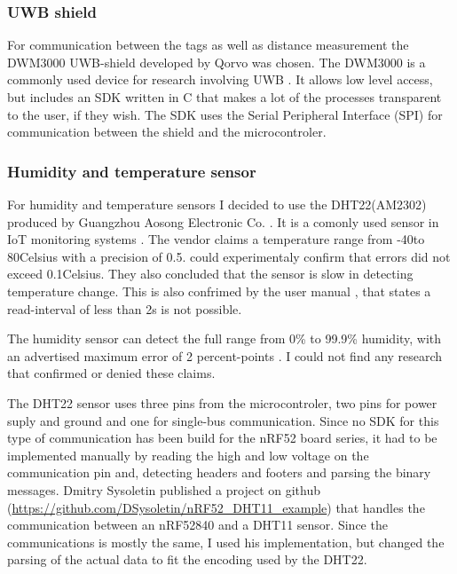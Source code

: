 \subsubsection{UWB shield}
For communication between the tags as well as distance measurement the DWM3000 UWB-shield developed by Qorvo was chosen.
The DWM3000 is a commonly used device for research involving UWB \cite{coppens2022overview, leu2022ghost, stocker2022performance}.
It allows low level access, but includes an SDK written in C that makes a lot of the processes transparent to the user, if they wish.
The SDK uses the Serial Peripheral Interface (SPI) for communication between the shield and the microcontroler.



\subsubsection{Humidity and temperature sensor}

For humidity and temperature sensors I decided to use the DHT22(AM2302) produced by Guangzhou Aosong Electronic Co. \cite{AM2302}. 
It is a comonly used sensor in IoT monitoring systems \cite{ahmad2021evaluation}. 
The vendor claims a temperature range from -40\degree to 80\degree Celsius with a precision of 0.5\degree. 
\cite{ahmad2021evaluation} could experimentaly confirm that errors did not exceed 0.1\degree Celsius. 
They also concluded that the sensor is slow in detecting temperature change. 
This is also confrimed by the user manual \cite{AM2302}, that states a read-interval of less than 2s is not possible. 

The humidity sensor can detect the full range from 0\% to 99.9\% humidity, with an advertised maximum error of 2 percent-points \cite{AM2302}.
I could not find any research that confirmed or denied these claims.

The DHT22 sensor uses three pins from the microcontroler, two pins for power suply and ground and one for single-bus communication.
Since no SDK for this type of communication has been build for the nRF52 board series, it had to be implemented manually by reading the high and low voltage on the communication pin and, detecting headers and footers and parsing the binary messages. 
Dmitry Sysoletin published a project on github (\url{https://github.com/DSysoletin/nRF52_DHT11_example}) that handles the communication between an nRF52840 and a DHT11 sensor. 
Since the communications is mostly the same, I used his implementation, but changed the parsing of the actual data to fit the encoding used by the DHT22.

